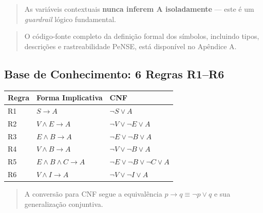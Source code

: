 \documentclass[11pt]{article}
\begin{document}
\begin{quote}
As variáveis contextuais \textbf{nunca inferem A isoladamente} --- este
é um \emph{guardrail} lógico fundamental.
\end{quote}

\begin{quote}
O código-fonte completo da definição formal dos símbolos, incluindo
tipos, descrições e rastreabilidade PeNSE, está disponível no Apêndice
A.
\end{quote}

\subsection{Base de Conhecimento: 6 Regras
R1--R6}\label{base-de-conhecimento-6-regras-r1r6}

{\def\LTcaptype{none} %
\begin{longtable}[]{@{}
  >{\raggedright\arraybackslash}p{}
  >{\raggedright\arraybackslash}p{}
  >{\raggedright\arraybackslash}p{}@{}}
\toprule\noalign{}
\begin{minipage}[b]{\linewidth}\raggedright
Regra
\end{minipage} & \begin{minipage}[b]{\linewidth}\raggedright
Forma Implicativa
\end{minipage} & \begin{minipage}[b]{\linewidth}\raggedright
CNF
\end{minipage} \\
\midrule\noalign{}
\endhead
\bottomrule\noalign{}
\endlastfoot
R1 & \(S \rightarrow A\) & \(\neg S \lor A\) \\
R2 & \(V \land E \rightarrow A\) & \(\neg V \lor \neg E \lor A\) \\
R3 & \(E \land B \rightarrow A\) & \(\neg E \lor \neg B \lor A\) \\
R4 & \(V \land B \rightarrow A\) & \(\neg V \lor \neg B \lor A\) \\
R5 & \(E \land B \land C \rightarrow A\) &
\(\neg E \lor \neg B \lor \neg C \lor A\) \\
R6 & \(V \land I \rightarrow A\) & \(\neg V \lor \neg I \lor A\) \\
\end{longtable}
}

\begin{quote}
A conversão para CNF segue a equivalência
\(p \rightarrow q \equiv \neg p \lor q\) e sua generalização conjuntiva.
\end{quote}
\end{document}
